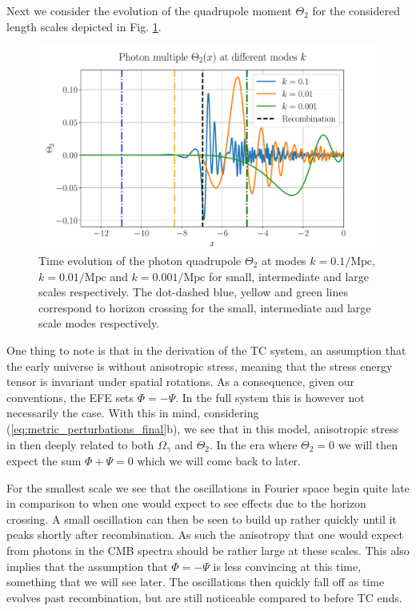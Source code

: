 \documentclass[%
reprint,
 amsmath,amssymb,
 aps,
]{revtex4-2}
\begin{document}
Next we consider the evolution of the quadrupole moment $\Theta_2$ for the considered length scales depicted in Fig. \ref{fig:T2}.

\begin{figure}[ht!]
	\includegraphics[width = \linewidth]{Figures/Theta2.pdf}
	\caption{Time evolution of the photon quadrupole $\Theta_2$ at modes $k=0.1/\text{Mpc}$, $k=0.01/\text{Mpc}$ and $k=0.001/\text{Mpc}$ for small, intermediate and large scales respectively. The dot-dashed blue, yellow and green lines correspond to horizon crossing for the small, intermediate and large scale modes respectively.}
	\label{fig:T2}
\end{figure}

One thing to note is that in the derivation of the TC system, an assumption that the early universe is without anisotropic stress, meaning that the stress energy tensor is invariant under spatial rotations. As a consequence, given our conventions, the EFE sets $\Phi=-\Psi$. In the full system this is however not necessarily the case. With this in mind, considering (\ref{eq:metric_perturbations_final}b), we see that in this model, anisotropic stress in then deeply related to both $\Omega_\gamma$ and $\Theta_2$. In the era where $\Theta_2=0$ we will then expect the sum $\Phi+\Psi=0$ which we will come back to later. 

For the smallest scale we see that the oscillations in Fourier space begin quite late in comparison to when one would expect to see effects due to the horizon crossing. A small oscillation can then be seen to build up rather quickly until it peaks shortly after recombination. As such the anisotropy that one would expect from photons in the CMB spectra should be rather large at these scales. This also implies that the assumption that $\Phi=-\Psi$ is less convincing at this time, something that we will see later. The oscillations then quickly fall off as time evolves past recombination, but are still noticeable compared to before TC ends.
\end{document}
